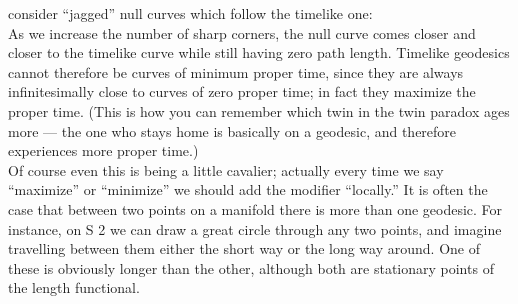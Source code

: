 consider “jagged” null curves which follow the timelike one: \\
As we increase the number of sharp corners, the null curve comes closer and closer to the
timelike curve while still having zero path length. Timelike geodesics cannot therefore be
curves of minimum proper time, since they are always infinitesimally close to curves of zero
proper time; in fact they maximize the proper time. (This is how you can remember which
twin in the twin paradox ages more — the one who stays home is basically on a geodesic,
and therefore experiences more proper time.)\\
Of course even this is being a little cavalier;
actually every time we say “maximize” or “minimize” we should add the modifier “locally.”
It is often the case that between two points on a manifold there is more than one geodesic.
For instance, on S 2 we can draw a great circle through any two points, and imagine travelling
between them either the short way or the long way around. One of these is obviously longer
than the other, although both are stationary points of the length functional.















